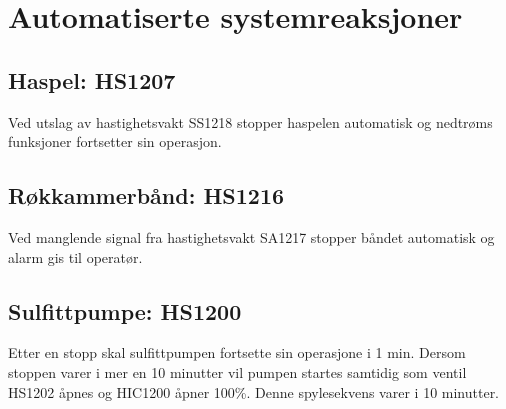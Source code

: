 \section{Automatiserte systemreaksjoner}
\subsection{Haspel: HS1207}
Ved utslag av hastighetsvakt SS1218 stopper haspelen automatisk og nedtrøms funksjoner fortsetter sin operasjon.

\subsection{Røkkammerbånd: HS1216}
Ved manglende signal fra hastighetsvakt SA1217 stopper båndet automatisk og alarm gis til operatør.

\subsection{Sulfittpumpe: HS1200}
Etter en stopp skal sulfittpumpen fortsette sin operasjone i 1 min. Dersom stoppen varer i mer en 10 minutter vil pumpen startes samtidig som ventil HS1202 åpnes og HIC1200 åpner 100\%. Denne spylesekvens varer i 10 minutter.
